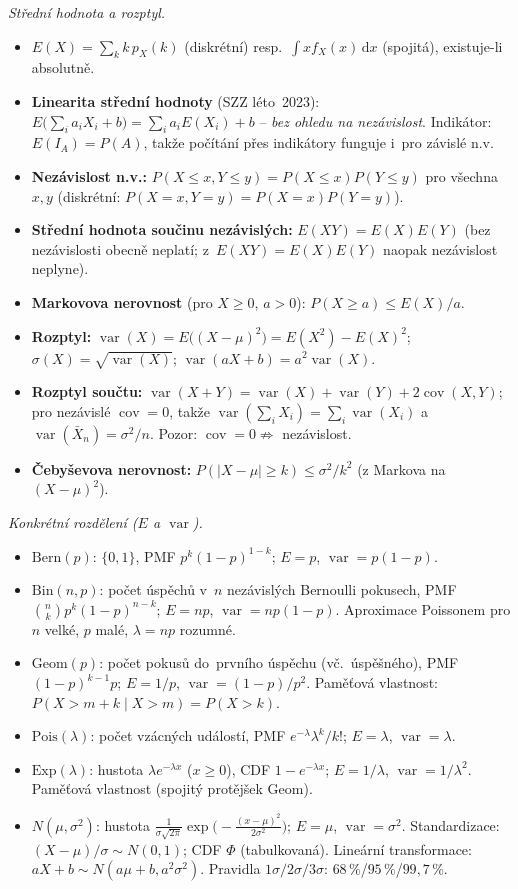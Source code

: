 \documentclass[11pt,a4paper]{article}
\DeclareMathOperator{\Var}{var}
\DeclareMathOperator{\Cov}{cov}
\begin{document}
\begin{poznamka}
\smallskip
\emph{Střední hodnota a rozptyl.}
\begin{itemize}
  \item $E(X)=\sum_k k\,p_X(k)$ (diskrétní) resp.\ $\int x f_X(x)\,\mathrm{d}x$ (spojitá), existuje-li absolutně.
  \item \textbf{Linearita střední hodnoty} (SZZ léto~2023): $E\bigl(\sum_i a_i X_i+b\bigr)=\sum_i a_i E(X_i)+b$ -- \emph{bez ohledu na nezávislost}. Indikátor: $E(I_A)=P(A)$, takže počítání přes indikátory funguje i~pro závislé n.v.
  \item \textbf{Nezávislost n.v.:} $P(X\le x,Y\le y)=P(X\le x)P(Y\le y)$ pro všechna $x,y$ (diskrétní: $P(X=x,Y=y)=P(X=x)P(Y=y)$).
  \item \textbf{Střední hodnota součinu nezávislých:} $E(XY)=E(X)E(Y)$ (bez nezávislosti obecně neplatí; z~$E(XY)=E(X)E(Y)$ naopak nezávislost neplyne).
  \item \textbf{Markovova nerovnost} (pro $X\ge 0$, $a>0$): $P(X\ge a)\le E(X)/a$.
  \item \textbf{Rozptyl:} $\Var(X)=E\bigl((X-\mu)^2\bigr)=E(X^2)-E(X)^2$; $\sigma(X)=\sqrt{\Var(X)}$; $\Var(aX+b)=a^2\Var(X)$.
  \item \textbf{Rozptyl součtu:} $\Var(X+Y)=\Var(X)+\Var(Y)+2\Cov(X,Y)$; pro nezávislé $\Cov=0$, takže $\Var(\sum_i X_i)=\sum_i\Var(X_i)$ a~$\Var(\bar X_n)=\sigma^2/n$. Pozor: $\Cov=0\not\Rightarrow$ nezávislost.
  \item \textbf{Čebyševova nerovnost:} $P(|X-\mu|\ge k)\le\sigma^2/k^2$ (z Markova na $(X-\mu)^2$).
\end{itemize}

\smallskip
\emph{Konkrétní rozdělení ($E$ a $\Var$).}
\begin{itemize}
  \item $\mathrm{Bern}(p)$: $\{0,1\}$, PMF $p^k(1-p)^{1-k}$; $E=p$, $\Var=p(1-p)$.
  \item $\mathrm{Bin}(n,p)$: počet úspěchů v~$n$ nezávislých Bernoulli pokusech, PMF $\binom{n}{k}p^k(1-p)^{n-k}$; $E=np$, $\Var=np(1-p)$. Aproximace Poissonem pro $n$ velké, $p$ malé, $\lambda=np$ rozumné.
  \item $\mathrm{Geom}(p)$: počet pokusů do~prvního úspěchu (vč.\ úspěšného), PMF $(1-p)^{k-1}p$; $E=1/p$, $\Var=(1-p)/p^2$. Paměťová vlastnost: $P(X>m+k\mid X>m)=P(X>k)$.
  \item $\mathrm{Pois}(\lambda)$: počet vzácných událostí, PMF $e^{-\lambda}\lambda^k/k!$; $E=\lambda$, $\Var=\lambda$.
  \item $\mathrm{Exp}(\lambda)$: hustota $\lambda e^{-\lambda x}$ ($x\ge 0$), CDF $1-e^{-\lambda x}$; $E=1/\lambda$, $\Var=1/\lambda^2$. Paměťová vlastnost (spojitý protějšek Geom).
  \item $N(\mu,\sigma^2)$: hustota $\frac{1}{\sigma\sqrt{2\pi}}\exp\!\bigl(-\tfrac{(x-\mu)^2}{2\sigma^2}\bigr)$; $E=\mu$, $\Var=\sigma^2$. Standardizace: $(X-\mu)/\sigma\sim N(0,1)$; CDF $\Phi$ (tabulkovaná). Lineární transformace: $aX+b\sim N(a\mu+b,a^2\sigma^2)$. Pravidla $1\sigma/2\sigma/3\sigma$: $68\,\%$/$95\,\%$/$99{,}7\,\%$.
\end{itemize}


\end{poznamka}
\end{document}

